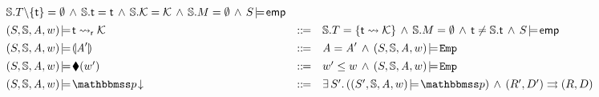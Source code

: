 \begin{figure*}[!t]
\[\begin{array}{lcl}
                \hpstate.\thrdpool\backslash\{\tid\} = \emptyset
                \,\land\,
                \hpstate.\tid = \tid
                \,\land\,
                \hpstate.\hthrdlocalst = \hthrdlocalst
                \,\land\,
                \hpstate.\Mem = \emptyset
                \,\land\, \asrtmodel{\state}{\aemp}
                \\
                \\[-8pt]
            \asrtmodel{(\state, \hpstate, \primcom, \word)}
                {\astRdyCont{\thrdid}{\hthrdlocalst}} & \define &
                \hpstate.\thrdpool =\{ \thrdid \rightsquigarrow \hthrdlocalst \}
                \, \land \, \hpstate.\Mem = \emptyset \, \land \,
                \tid \neq \hpstate.\tid\,\land\,
                \asrtmodel{\state}{\aemp} \\
            \\[-8pt]
            \asrtmodel{(\state, \hpstate, \primcom, \word)}
                {\safePrimAst{\primcom'}} & \define &
                \primcom = \primcom' \, \land \,
                \asrtmodel{(\state, \hpstate, \primcom, \word)}{\empAst} \\
            \\[-8pt]
            \asrtmodel{(\state, \hpstate, \primcom, \word)}
                {\metricAst{\word'}}
            & \define & \word' \leq \word \, \land \,
            \asrtmodel{(\state, \hpstate, \primcom, \word)}{\empAst} \\
            \\[-8pt]
            \asrtmodel{(\state, \hpstate, \primcom, \word)}{\nxtAst{\relastP}}
            & \define &
            \exists \, \state'. \,
            (\asrtmodel{(\state', \hpstate, \primcom, \word)}{\relastP})
            \, \land \, \Dstep{(\RFile', \DBuf')}{(\RFile, \DBuf)} \\

\end{array}\]
\end{figure*}
